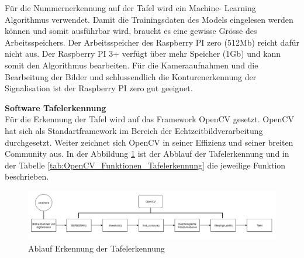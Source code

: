 \documentclass[../../main.tex]{subfiles}
\begin{document}
    Für die Nummernerkennung auf der Tafel wird ein Machine- Learning Algorithmus verwendet. Damit die Trainingsdaten des Models eingelesen werden können und somit ausführbar wird, braucht es eine gewisse Grösse des Arbeitsspeichers. Der Arbeitsspeicher des Raspberry PI zero (512Mb) reicht dafür nicht aus. Der Raspberry PI 3+ verfügt über mehr Speicher (1Gb) und kann somit den Algorithmus bearbeiten. Für die Kameraaufnahmen und die Bearbeitung der Bilder und schlussendlich die Konturenerkennung der Signalisation ist der Raspberry PI zero  gut geeignet.
    \pagebreak

    \textbf{Software Tafelerkennung}\\
    Für die Erkennung der Tafel wird auf das Framework OpenCV gesetzt. OpenCV hat sich als Standartframework im Bereich der Echtzeitbildverarbeitung durchgesetzt. Weiter zeichnet sich OpenCV in seiner Effizienz und seiner breiten Community aus. In der Abbildung \ref{fig:ablauf_tafelerkennung} ist der Abblauf der Tafelerkennung und in der Tabelle \ref{tab:OpenCV_Funktionen_Tafelerkennung} die jeweilige Funktion beschrieben.



    \begin{figure}[H] %
        \centering
        \includegraphics[width=1\textwidth]{Ablauf_Tafelerkennung.png}
        \caption{Ablauf Erkennung der Tafelerkennung}
        \label{fig:ablauf_tafelerkennung}
    \end{figure}
\end{document}
